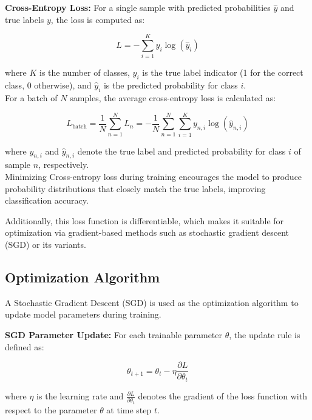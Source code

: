 \documentclass[conference]{IEEEtran}
\begin{document}
\textbf{Cross-Entropy Loss:} For a single sample with predicted probabilities \(\hat{y}\) and true labels \(y\), the loss is computed as:

\begin{equation}
L = -\sum_{i=1}^{K} y_i \log(\hat{y}_i)
\end{equation}

where \(K\) is the number of classes, \(y_i\) is the true label indicator (1 for the correct class, 0 otherwise), and \(\hat{y}_i\) is the predicted probability for class \(i\).\\

\noindent For a batch of \(N\) samples, the average cross-entropy loss is calculated as:

\begin{equation}
L_{\text{batch}} = \frac{1}{N} \sum_{n=1}^{N} L_n = -\frac{1}{N} \sum_{n=1}^{N} \sum_{i=1}^{K} y_{n,i} \log(\hat{y}_{n,i})
\end{equation}

where \(y_{n,i}\) and \(\hat{y}_{n,i}\) denote the true label and predicted probability for class \(i\) of sample \(n\), respectively.\\

 \noindent Minimizing Cross-entropy loss during training encourages the model to produce probability distributions that closely match the true labels, improving classification accuracy.

\noindent Additionally, this loss function is differentiable, which makes it suitable for optimization via gradient-based methods such as stochastic gradient descent (SGD) or its variants.

\subsection{Optimization Algorithm}

A Stochastic Gradient Descent (SGD) is used as the optimization algorithm to update model parameters during training.

\textbf{SGD Parameter Update:} For each trainable parameter \(\theta\), the update rule is defined as:

\begin{equation}
\theta_{t+1} = \theta_t - \eta \frac{\partial L}{\partial \theta_t}
\label{equation3}
\end{equation}

where \(\eta\) is the learning rate and \(\frac{\partial L}{\partial \theta_t}\) denotes the gradient of the loss function with respect to the parameter \(\theta\) at time step \(t\).
\end{document}
